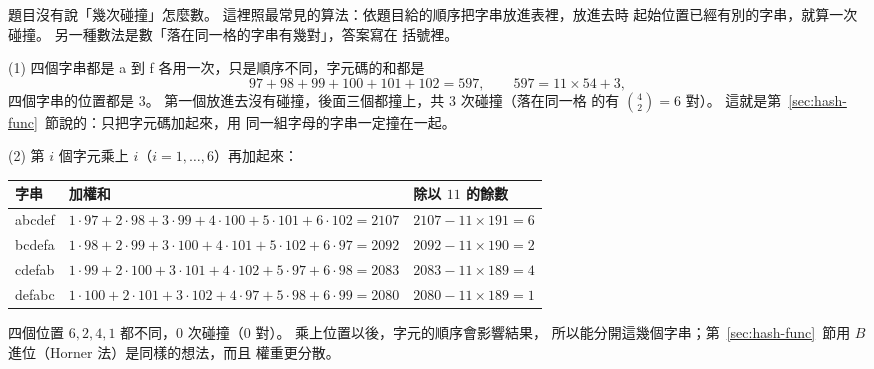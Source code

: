 題目沒有說「幾次碰撞」怎麼數。 這裡照最常見的算法：依題目給的順序把字串放進表裡，放進去時
起始位置已經有別的字串，就算一次碰撞。 另一種數法是數「落在同一格的字串有幾對」，答案寫在
括號裡。

(1) 四個字串都是 a 到 f 各用一次，只是順序不同，字元碼的和都是
\[
97 + 98 + 99 + 100 + 101 + 102 = 597, \qquad 597 = 11 \times 54 + 3,
\]
四個字串的位置都是 $3$。 第一個放進去沒有碰撞，後面三個都撞上，共 $3$ 次碰撞（落在同一格
的有 $\binom{4}{2} = 6$ 對）。 這就是第~\ref{sec:hash-func}~節說的：只把字元碼加起來，用
同一組字母的字串一定撞在一起。

(2) 第 $i$ 個字元乘上 $i$（$i = 1, \ldots, 6$）再加起來：
\begin{center}
\small
\begin{tabular}{lll}
\toprule
字串 & 加權和 & 除以 $11$ 的餘數 \\
\midrule
abcdef & $1 \cdot 97 + 2 \cdot 98 + 3 \cdot 99 + 4 \cdot 100 + 5 \cdot 101 + 6 \cdot 102 = 2107$ & $2107 - 11 \times 191 = 6$ \\
bcdefa & $1 \cdot 98 + 2 \cdot 99 + 3 \cdot 100 + 4 \cdot 101 + 5 \cdot 102 + 6 \cdot 97 = 2092$ & $2092 - 11 \times 190 = 2$ \\
cdefab & $1 \cdot 99 + 2 \cdot 100 + 3 \cdot 101 + 4 \cdot 102 + 5 \cdot 97 + 6 \cdot 98 = 2083$ & $2083 - 11 \times 189 = 4$ \\
defabc & $1 \cdot 100 + 2 \cdot 101 + 3 \cdot 102 + 4 \cdot 97 + 5 \cdot 98 + 6 \cdot 99 = 2080$ & $2080 - 11 \times 189 = 1$ \\
\bottomrule
\end{tabular}
\end{center}
四個位置 $6, 2, 4, 1$ 都不同，$0$ 次碰撞（$0$ 對）。 乘上位置以後，字元的順序會影響結果，
所以能分開這幾個字串；第~\ref{sec:hash-func}~節用 $B$ 進位（Horner 法）是同樣的想法，而且
權重更分散。

